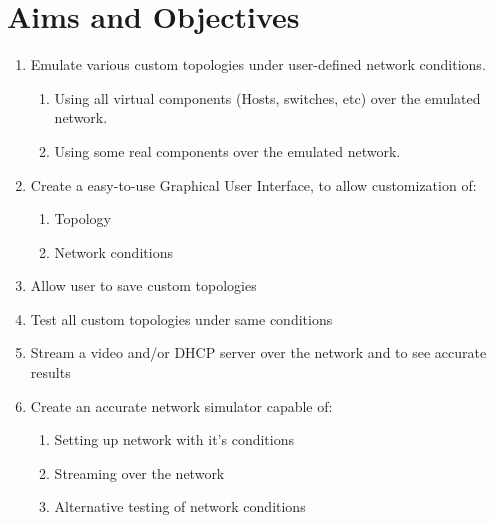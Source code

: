 \section{Aims and Objectives}
\begin{enumerate}
\item Emulate various custom topologies under user-defined network conditions.
\begin{enumerate}
\item Using all virtual components (Hosts, switches, etc) over the emulated network.
\item Using some real components over the emulated network.
\end{enumerate}
\item Create a easy-to-use Graphical User Interface, to allow customization of:
\begin{enumerate}
\item Topology
\item Network conditions
\end{enumerate}
\item Allow user to save custom topologies
\item Test all custom topologies under same conditions
\item Stream a video and/or DHCP server over the network and to see accurate results
\item Create an accurate network simulator capable of:
\begin{enumerate}
\item Setting up network with it's conditions
\item Streaming over the network
\item Alternative testing of network conditions
\end{enumerate}
\end{enumerate}\newpage
